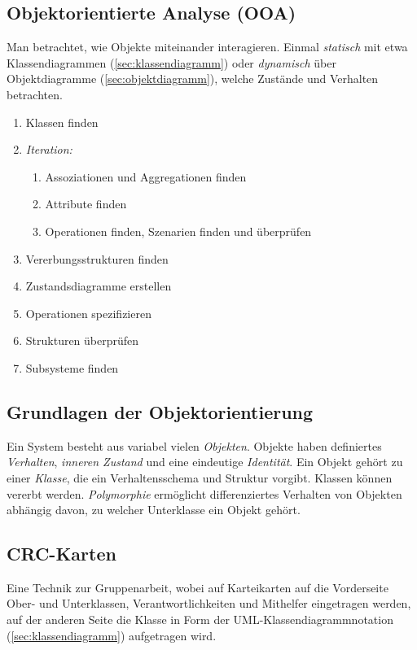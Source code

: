 \documentclass{panikzettel}
\begin{document}
\subsection{Objektorientierte Analyse (OOA)}

Man betrachtet, wie Objekte miteinander interagieren. Einmal \emph{statisch} mit etwa Klassendiagrammen (\ref{sec:klassendiagramm}) oder \emph{dynamisch} über Objektdiagramme (\ref{sec:objektdiagramm}), welche Zustände und Verhalten betrachten.

\begin{enumerate}
\item Klassen finden
\item \textit{Iteration:} \begin{enumerate}
\item Assoziationen und Aggregationen finden
\item Attribute finden
\item Operationen finden, Szenarien finden und überprüfen
\end{enumerate}
\item Vererbungsstrukturen finden
\item Zustandsdiagramme erstellen
\item Operationen spezifizieren
\item Strukturen überprüfen
\item Subsysteme finden
\end{enumerate}


\subsection{Grundlagen der Objektorientierung}

Ein System besteht aus variabel vielen \emph{Objekten}. Objekte haben definiertes \emph{Verhalten}, \emph{inneren Zustand} und eine eindeutige \emph{Identität}. Ein Objekt gehört zu einer \emph{Klasse}, die ein Verhaltensschema und Struktur vorgibt. Klassen können vererbt werden. \emph{Polymorphie} ermöglicht differenziertes Verhalten von Objekten abhängig davon, zu welcher Unterklasse ein Objekt gehört.

\subsection{CRC-Karten}

Eine Technik zur Gruppenarbeit, wobei auf Karteikarten auf die Vorderseite Ober- und Unterklassen, Verantwortlichkeiten und Mithelfer eingetragen werden, auf der anderen Seite die Klasse in Form der UML-Klassendiagrammnotation (\ref{sec:klassendiagramm}) aufgetragen wird.
\end{document}
